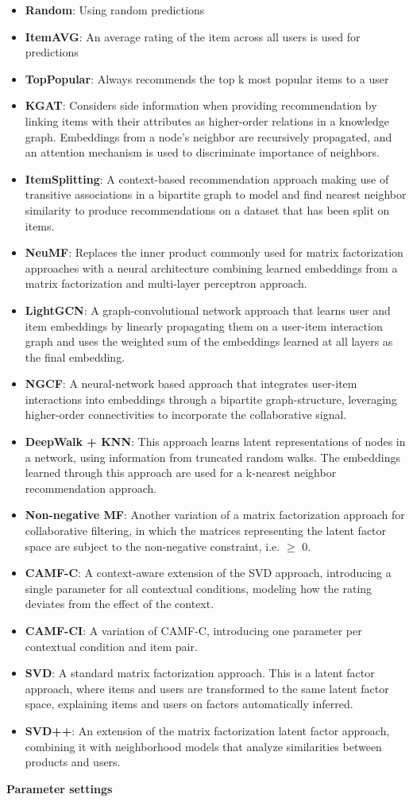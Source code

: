 \begin{itemize}
    \item \textbf{Random}: Using random predictions
    \item \textbf{ItemAVG}: An average rating of the item across all users is used for predictions
    \item \textbf{TopPopular}: Always recommends the top k most popular items to a user
    \item \textbf{KGAT}: Considers side information when providing recommendation by linking items with their attributes as higher-order relations in a knowledge graph. Embeddings from a node's neighbor are recursively propagated, and an attention mechanism is used to discriminate importance of neighbors.
    \item \textbf{ItemSplitting}: A context-based recommendation approach making use of transitive associations in a bipartite graph to model and find nearest neighbor similarity to produce recommendations on a dataset that has been split on items.
    \item \textbf{NeuMF}: Replaces the inner product commonly used for matrix factorization approaches with a neural architecture combining learned embeddings from a matrix factorization and multi-layer perceptron approach.
    \item \textbf{LightGCN}: A graph-convolutional network approach that learns user and item embeddings by linearly propagating them on a user-item interaction graph and uses the weighted sum of the embeddings learned at all layers as the final embedding.
    \item \textbf{NGCF}: A neural-network based approach that integrates user-item interactions into embeddings through a bipartite graph-structure, leveraging higher-order connectivities to incorporate the collaborative signal.
    \item \textbf{DeepWalk + KNN}: This approach learns latent representations of nodes in a network, using information from truncated random walks. The embeddings learned through this approach are used for a k-nearest neighbor recommendation approach.
    \item \textbf{Non-negative MF}: Another variation of a matrix factorization approach for collaborative filtering, in which the matrices representing the latent factor space are subject to the non-negative constraint, i.e. $\geq$ 0.
    \item \textbf{CAMF-C}: A context-aware extension of the SVD approach, introducing a single parameter for all contextual conditions, modeling how the rating deviates from the effect of the context.
    \item \textbf{CAMF-CI}: A variation of CAMF-C, introducing one parameter per contextual condition and item pair.
    \item \textbf{SVD}: A standard matrix factorization approach. This is a latent factor approach, where items and users are transformed to the same latent factor space, explaining items and users on factors automatically inferred.
    \item \textbf{SVD++}: An extension of the matrix factorization latent factor approach, combining it with neighborhood models that analyze similarities between products and users.
\end{itemize}
\textbf{Parameter settings}\\
